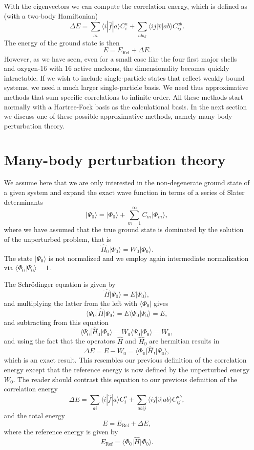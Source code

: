 With the eigenvectors we can compute
  the correlation energy, which is defined as (with a two-body Hamiltonian)
  \[
  \Delta E=\sum_{ai}\langle i| \hat{f}|a \rangle C_{i}^{a}+
  \sum_{abij}\langle ij | \hat{v}| ab \rangle C_{ij}^{ab}.
  \]
The energy of  the ground state is then
  \[
  E=E_{\mathrm{Ref}}+\Delta E.
  \]
  However, as we have seen, even for a
  small case like the four first major shells and 
  oxygen-16 with 16 active nucleons, the dimensionality becomes quickly intractable. If we
  wish to include single-particle states that reflect weakly bound
  systems, we need a much larger single-particle basis. We need thus
  approximative methods that sum specific correlations to infinite
  order.  All these methods start normally with a Hartree-Fock basis
  as the calculational basis. In the next section we discuss one of
  these possible approximative methods, namely many-body perturbation
  theory.

  \section{Many-body perturbation theory}\label{sec:mbpt}

  We assume here that we are only interested in the non-degenerate
  ground state of a given system and expand the exact wave function in
  terms of a series of Slater determinants
  \[
  \vert \Psi_0\rangle = \vert \Phi_0\rangle +
  \sum_{m=1}^{\infty}C_m\vert \Phi_m\rangle,
  \]
  where we have assumed that the true ground state is dominated by the
  solution of the unperturbed problem, that is
  \[
  \hat{H}_0\vert \Phi_0\rangle= W_0\vert \Phi_0\rangle.
  \]
  The state $\vert \Psi_0\rangle$ is not normalized and we employ again
  intermediate normalization via $\langle \Phi_0 \vert
  \Psi_0\rangle=1$.

  The Schr\"odinger equation is given by
  \[
  \hat{H}\vert \Psi_0\rangle = E\vert \Psi_0\rangle,
  \]
  and multiplying the latter from the left with $\langle \Phi_0\vert $
  gives
  \[
  \langle \Phi_0\vert \hat{H}\vert \Psi_0\rangle = E\langle
  \Phi_0\vert \Psi_0\rangle=E,
  \]
  and subtracting from this equation
  \[
  \langle \Psi_0\vert \hat{H}_0\vert \Phi_0\rangle= W_0\langle
  \Psi_0\vert \Phi_0\rangle=W_0,
  \]
  and using the fact that the  operators $\hat{H}$ and $\hat{H}_0$
  are hermitian results in
  \begin{equation}\label{eq:mbptcorrel}
  \Delta E=E-W_0=\langle \Phi_0\vert \hat{H}_I\vert \Psi_0\rangle,
  \end{equation}
  which is an exact result. This resembles our previous definition of the correlation energy except that the reference energy is now defined
by the unperturbed energy $W_0$. The reader should contrast this equation to our previous definition of the correlation energy
  \[
  \Delta E=\sum_{ai}\langle i| \hat{f}|a \rangle C_{i}^{a}+
  \sum_{abij}\langle ij | \hat{v}| ab \rangle C_{ij}^{ab},
  \]
and the total energy
  \[
  E=E_{\mathrm{Ref}}+\Delta E,
  \]
where the reference energy is given by
\[   
   E_{\mathrm{Ref}}= \langle \Phi_0 \vert \hat{H} \vert \Phi_0\rangle.
\]

